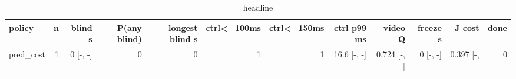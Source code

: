 \begin{table}[t]\centering\small
\begin{tabular}{lrrrrrrrrrrr}\toprule
policy & n & blind s & P(any blind) & longest blind s & ctrl<=100ms & ctrl<=150ms & ctrl p99 ms & video Q & freeze s & J cost & done \\\midrule
pred\_cost & 1 & 0 [-, -] & 0 & 0 & 1 & 1 & 16.6 [-, -] & 0.724 [-, -] & 0 [-, -] & 0.397 [-, -] & 0 \\
\bottomrule\end{tabular}\caption{headline}\end{table}
